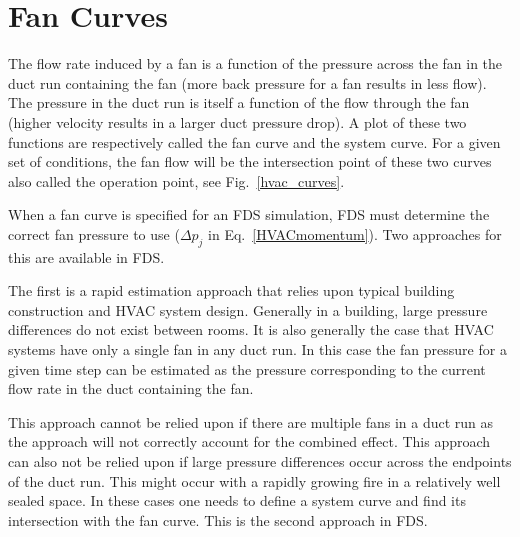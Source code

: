 \section{Fan Curves}

The flow rate induced by a fan is a function of the pressure across the fan in the duct run containing the fan (more back pressure for a fan results in less flow). The pressure in the duct run is itself a function of the flow through the fan (higher velocity results in a larger duct pressure drop). A plot of these two functions are respectively called the fan curve and the system curve. For a given set of conditions, the fan flow will be the intersection point of these two curves also called the operation point, see Fig.~\ref{hvac_curves}.

When a fan curve is specified for an FDS simulation, FDS must determine the correct fan pressure to use ($\Delta p_j$ in Eq.~\ref{HVACmomentum}). Two approaches for this are available in FDS.

The first is a rapid estimation approach that relies upon typical building construction and HVAC system design. Generally in a building, large pressure differences do not exist between rooms. It is also generally the case that HVAC systems have only a single fan in any duct run. In this case the fan pressure for a given time step can be estimated as the pressure corresponding to the current flow rate in the duct containing the fan. 

This approach cannot be relied upon if there are multiple fans in a duct run as the approach will not correctly account for the combined effect. This approach can also not be relied upon if large pressure differences occur across the endpoints of the duct run. This might occur with a rapidly growing fire in a relatively well sealed space. In these cases one needs to define a system curve and find its intersection with the fan curve. This is the second approach in FDS.

